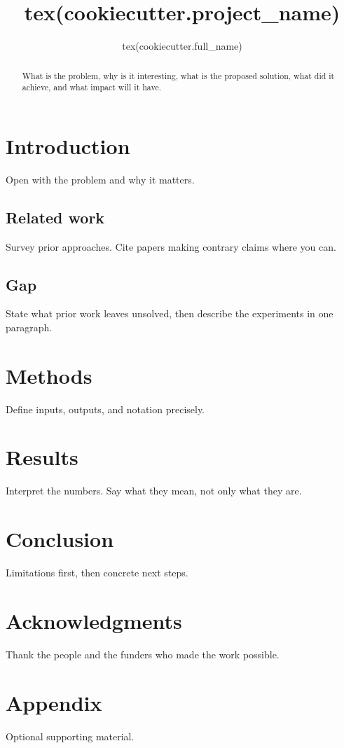 \documentclass[
  journal=medium,
  manuscript=technical-report,
  year=\the\year,
  volume=0,
]{cup-journal}
\title{ {{ tex(cookiecutter.project_name) }} }
\author{ {{ tex(cookiecutter.full_name) }} }
\affiliation{ {{ tex(cookiecutter.affiliation) }} }
\begin{document}
\maketitle

\begin{abstract}
What is the problem, why is it interesting, what is the proposed solution, what did it achieve, and what impact will it have.
\end{abstract}

\section{Introduction}

Open with the problem and why it matters.

\subsection{Related work}

Survey prior approaches.
Cite papers making contrary claims where you can.

\subsection{Gap}

State what prior work leaves unsolved, then describe the experiments in one paragraph.

\section{Methods}

Define inputs, outputs, and notation precisely.

\section{Results}

Interpret the numbers.
Say what they mean, not only what they are.

\section{Conclusion}

Limitations first, then concrete next steps.

\section*{Acknowledgments}

Thank the people and the funders who made the work possible.

\printbibliography

\clearpage
\appendix

\section{Appendix}

Optional supporting material.
\end{document}
